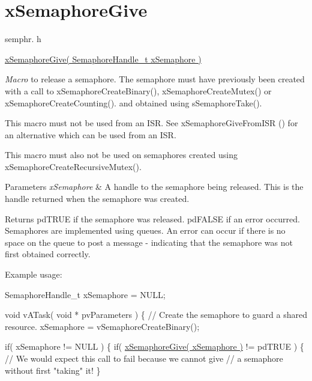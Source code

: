 \hypertarget{group__xSemaphoreGive}{}\section{x\+Semaphore\+Give}
\label{group__xSemaphoreGive}
semphr. h 
\begin{DoxyPre}\hyperlink{semphr_8h_aae55761cabfa9bf85c8f4430f78c0953}{xSemaphoreGive( SemaphoreHandle\_t xSemaphore )}\end{DoxyPre}


{\itshape Macro} to release a semaphore. The semaphore must have previously been created with a call to x\+Semaphore\+Create\+Binary(), x\+Semaphore\+Create\+Mutex() or x\+Semaphore\+Create\+Counting(). and obtained using s\+Semaphore\+Take().

This macro must not be used from an I\+SR. See x\+Semaphore\+Give\+From\+I\+SR () for an alternative which can be used from an I\+SR.

This macro must also not be used on semaphores created using x\+Semaphore\+Create\+Recursive\+Mutex().


\begin{DoxyParams}{Parameters}
{\em x\+Semaphore} & A handle to the semaphore being released. This is the handle returned when the semaphore was created.\\
\hline
\end{DoxyParams}
\begin{DoxyReturn}{Returns}
pd\+T\+R\+UE if the semaphore was released. pd\+F\+A\+L\+SE if an error occurred. Semaphores are implemented using queues. An error can occur if there is no space on the queue to post a message -\/ indicating that the semaphore was not first obtained correctly.
\end{DoxyReturn}
Example usage\+: 
\begin{DoxyPre}
SemaphoreHandle\_t xSemaphore = NULL;\end{DoxyPre}



\begin{DoxyPre}void vATask( void * pvParameters )
\{
   // Create the semaphore to guard a shared resource.
   xSemaphore = vSemaphoreCreateBinary();\end{DoxyPre}



\begin{DoxyPre}   if( xSemaphore != NULL )
   \{
       if( \hyperlink{semphr_8h_aae55761cabfa9bf85c8f4430f78c0953}{xSemaphoreGive( xSemaphore )} != pdTRUE )
       \{
           // We would expect this call to fail because we cannot give
           // a semaphore without first "taking" it!
       \}\end{DoxyPre}




